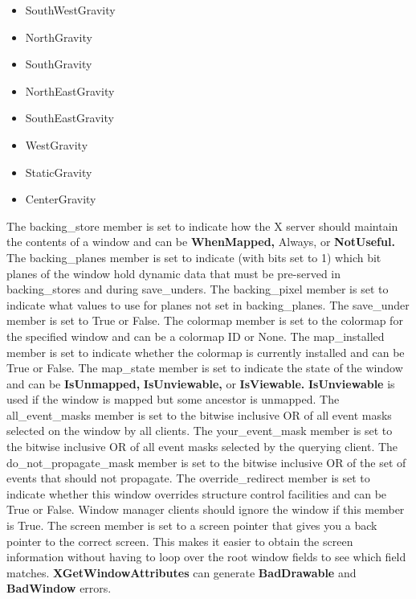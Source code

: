 \documentclass{report}
\begin{document}
\begin{itemize}
\begin{itemize}
                \item SouthWestGravity
                \item NorthGravity 
                \item SouthGravity
                \item NorthEastGravity 
                \item SouthEastGravity
                \item WestGravity 
                \item StaticGravity
                \item CenterGravity
            \end{itemize}
            The backing\_store member is set to indicate how the X server should maintain the contents of a window and can be \textbf{WhenMapped,} Always, or \textbf{NotUseful.} The backing\_planes member is set to indicate (with bits set to 1) which bit planes of the window hold dynamic data that must be pre-served in backing\_stores and during save\_unders. The backing\_pixel member is set to indicate what values to use for planes not set in backing\_planes.
            \bigbreak \noindent 
            The save\_under member is set to True or False. The colormap member is set to the colormap for the specified window and can be a colormap ID or None. The map\_installed member is set to indicate whether the colormap is currently installed and can be True or False. The map\_state member is set to indicate the state of the window and can be \textbf{IsUnmapped,} \textbf{IsUnviewable,} or \textbf{IsViewable.} \textbf{IsUnviewable} is used if the window is mapped but some ancestor is unmapped.
            \bigbreak \noindent 
            The all\_event\_masks member is set to the bitwise inclusive OR of all event masks selected on the window by all clients. The your\_event\_mask member is set to the bitwise inclusive OR of all event masks selected by the querying client. The do\_not\_propagate\_mask member is set to the bitwise inclusive OR of the set of events that should not propagate.
            \bigbreak \noindent 
            The override\_redirect member is set to indicate whether this window overrides structure control facilities and can be True or False. Window manager clients should ignore the window if this member is True.
            \bigbreak \noindent 
            The screen member is set to a screen pointer that gives you a back pointer to the correct screen. This makes it easier to obtain the screen information without having to loop over the root window fields to see which field matches. \textbf{XGetWindowAttributes} can generate \textbf{BadDrawable} and \textbf{BadWindow} errors.

\end{itemize}
\end{document}
